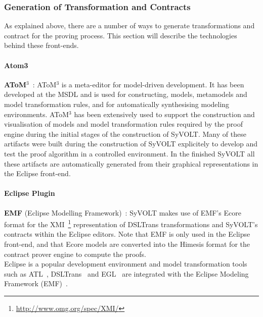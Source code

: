 \subsubsection{Generation of Transformation and Contracts}

As explained above, there are a number of ways to generate transformations and contract for the proving process. This section will describe the technologies behind these front-ends.

\paragraph{Atom3}

\textbf{AToM$^3$}~\cite{atom3:2002}: AToM$^3$ is a
  meta-editor for
  model-driven development.
  It has been developed at the MSDL and is used for constructing,
  models, metamodels and model transformation rules, and for automatically 
  synthesising modeling environments.
  AToM$^3$ has been extensively used to support the construction and
  visualisation of models and model transformation rules required by the proof
  engine during the initial stages of the construction of SyVOLT. 
  Many of these artifacts were built during the construction
  of SyVOLT explicitely to develop and test the proof algorithm in a
  controlled environment. In the finished SyVOLT all these artifacts are automatically
  generated from their graphical representations in the Eclipse front-end.\\
  
\paragraph{Eclipse Plugin}

 \textbf{EMF} (Eclipse Modelling Framework)~\cite{emfTool}: SyVOLT makes
  use of EMF's Ecore format for the
  XMI~\footnote{\url{http://www.omg.org/spec/XMI/}} representation of DSLTrans
  transformations and SyVOLT's contracts within the Eclipse editors.
  Note that EMF is only used in the Eclipse front-end, and that Ecore models are converted
  into the Himesis format for the contract prover engine to compute the
  proofs.\\
  
  
  Eclipse is a popular development environment and model
  transformation tools such as ATL~\cite{atlTool}, DSLTrans~\cite{Barroca2011} and
  EGL~\cite{eglTool} are integrated with the Eclipse Modeling Framework
  (EMF)~\cite{emfTool}.
  
